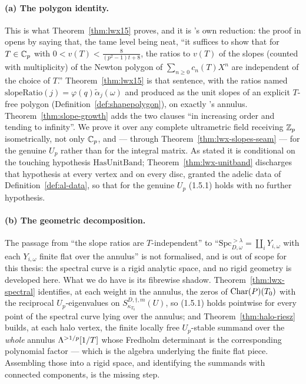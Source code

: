 \paragraph{(a) The polygon identity.}  This is what Theorem~\ref{thm:lwx15} proves, and it is
\cite{LWX}'s own reduction: the proof in \cite[\S4.2]{LWX} opens by saying that, the tame level
being neat, ``it suffices to show that for $T \in \mathbb{C}_p$ with
$0 < v(T) < \tfrac{8}{(p^{2}-1)t+8}$, the ratios to $v(T)$ of the slopes (counted with
multiplicity) of the Newton polygon of $\sum_{n\geq0} c_n(T)X^{n}$ are independent of the choice
of $T$.''  Theorem~\ref{thm:lwx15} is that sentence, with the ratios named
$\mathrm{slopeRatio}(j) = \varphi(q)\tilde\alpha_j(\omega)$ and produced as the unit slopes of an
explicit $T$-free polygon (Definition~\ref{def:shapepolygon}), on exactly \cite{LWX}'s annulus.
Theorem~\ref{thm:slope-growth} adds the two clauses ``in increasing order and tending to
infinity''.  We prove it over any complete ultrametric field receiving $\mathbb{Z}_p$ isometrically, not
only $\mathbb{C}_p$, and --- through Theorem~\ref{thm:lwx-slopes-seam} --- for the genuine $U_p$ rather
than for the integral matrix.  As stated it is conditional on the touching hypothesis
$\mathrm{HasUnitBand}$; Theorem~\ref{thm:lwx-unitband} discharges that hypothesis at every vertex
and on every disc, granted the adelic data of Definition~\ref{def:al-data}, so that for the genuine
$U_p$ (1.5.1) holds with no further hypothesis.

\paragraph{(b) The geometric decomposition.}  The passage from ``the slope ratios are
$T$-independent'' to ``$\mathrm{Spc}^{>\lambda}_{D,\omega} = \coprod_i Y_{i,\omega}$ with each
$Y_{i,\omega}$ finite flat over the annulus'' is not formalised, and is out of scope for this
thesis: the spectral curve is a rigid analytic space, and no rigid geometry is developed here.
What we do have is its fibrewise shadow.  Theorem~\ref{thm:lwx-spectral} identifies, at each
weight in the annulus, the zeros of $\operatorname{Char}(P)(T_0)$ with the reciprocal $U_p$-eigenvalues on
$S^{D,\dagger,m}_{\kappa_{T_0}}(U)$, so (1.5.1) holds pointwise for every point of the spectral
curve lying over the annulus; and Theorem~\ref{thm:halo-riesz} builds, at each halo vertex, the
finite locally free $U_p$-stable summand over the \emph{whole} annulus $\Lambda^{>1/p}[1/T]$ whose
Fredholm determinant is the corresponding polynomial factor --- which is the algebra underlying
the finite flat piece.  Assembling those into a rigid space, and identifying the summands with
connected components, is the missing step.

